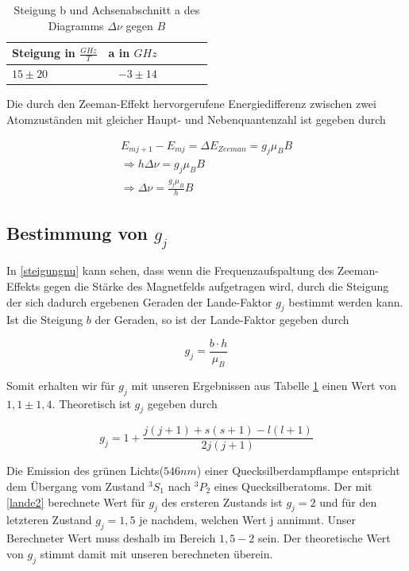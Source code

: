 \documentclass[10pt,a4paper]{article}
\begin{document}
\begin{table}[h!]
	\centering
	\begin{tabular}{|l|r|c|lrp{16cm}}\hline
		Steigung in $\frac{GHz}{T}$ & a in $GHz$\\\hline
		$15 \pm 20$ & $-3 \pm 14$\\\hline
	\end{tabular}
	\caption{Steigung b und Achsenabschnitt a  des Diagramms $\Delta\nu$ gegen $B$}
	\label{diagramm_werte}
\end{table}



Die durch den Zeeman-Effekt hervorgerufene Energiedifferenz zwischen zwei Atomzuständen mit gleicher Haupt- und Nebenquantenzahl ist gegeben durch

\begin{align}
	E_{mj+1}- E_{mj} = \Delta E_{Zeeman} = g_j \mu_B B \\
	\Rightarrow h \Delta \nu =  g_j \mu_B B \\
	\Rightarrow \Delta \nu = \frac{g_j \mu_B}{h} B
	\label{steigungnu}
\end{align}

\subsection{Bestimmung von $g_j$}

In \ref{steigungnu} kann sehen, dass wenn die Frequenzaufspaltung des Zeeman-Effekts gegen die Stärke des Magnetfelds aufgetragen wird, durch die Steigung der sich dadurch ergebenen Geraden der Lande-Faktor $g_j$ bestimmt werden kann. Ist die Steigung $b$ der Geraden, so ist der Lande-Faktor gegeben durch

\begin{equation}
g_j = \frac{b \cdot h}{\mu_B}
\end{equation}

Somit erhalten wir für $g_j$ mit unseren Ergebnissen aus Tabelle \ref{diagramm_werte} einen Wert von $1,1 \pm 1,4$. Theoretisch ist $g_j$ gegeben durch

\begin{equation}
 g_j = 1 + \frac{j(j+1) + s(s+1) - l(l+1)}{2 j(j+1)}
 \label{lande2}
\end{equation}

Die Emission des grünen Lichts($546 nm$) einer Quecksilberdampflampe entspricht dem Übergang vom Zustand $^3S_1$ nach $^3P_2$ eines Quecksilberatoms. Der mit \ref{lande2} berechnete Wert für $g_j$ des ersteren Zustands ist $g_j = 2$ und für den letzteren Zustand $g_j =1,5$ je nachdem, welchen Wert j annimmt. Unser Berechneter Wert muss deshalb im Bereich $1,5-2$ sein. Der theoretische Wert von $g_j$ stimmt damit mit unseren berechneten überein.
\end{document}
